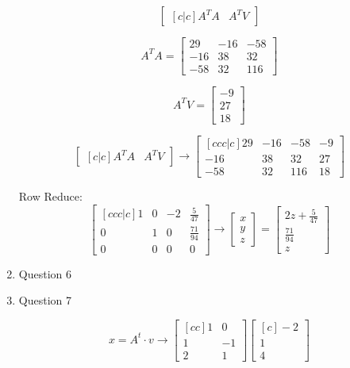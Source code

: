 \documentclass[a4paper,11pt]{article}
\begin{document}
\begin{preview}
\begin{enumerate}
        $$ \begin{bmatrix}[c|c]
            A^TA&A^TV
        \end{bmatrix} $$

        $$ A^TA = \begin{bmatrix}29&-16&-58\\ -16&38&32\\ -58&32&116\end{bmatrix} $$

        $$ A^TV = \begin{bmatrix}-9\\ 27\\ 18\end{bmatrix} $$

        $$ \begin{bmatrix}[c|c]
            A^TA&A^TV
        \end{bmatrix}  \rightarrow 
        \begin{bmatrix}[ccc|c] 29&-16&-58&-9\\ -16&38&32&27\\ -58&32&116&18\end{bmatrix} $$

        Row Reduce:
        $$ \begin{bmatrix}[ccc|c] 1&0&-2&\frac{5}{47}\\ 0&1&0&\frac{71}{94}\\ 0&0&0&0\end{bmatrix} \rightarrow \begin{bmatrix}x \\ y \\ z \end{bmatrix} = \begin{bmatrix}2z + \frac{5}{47} \\ \frac{71}{94} \\ z\end{bmatrix}$$


        \item Question 6



        \item Question 7

        $$ x = A^t \cdot v \rightarrow \begin{bmatrix}[cc] 1&0\\ 1&-1\\ 2&1 \end{bmatrix} 
        \begin{bmatrix}[c] -2\\ 1\\ 4 \end{bmatrix}  $$


\end{enumerate}
\end{preview}
\end{document}
